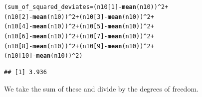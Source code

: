 \documentclass{tufte-handout}\usepackage[]{graphicx}\usepackage[]{color}
\makeatletter
\newcommand{\hlnum}[1]{\textcolor[rgb]{0.686,0.059,0.569}{#1}}%
\newcommand{\hlopt}[1]{\textcolor[rgb]{0,0,0}{#1}}%
\newcommand{\hlstd}[1]{\textcolor[rgb]{0.345,0.345,0.345}{#1}}%
\newcommand{\hlkwb}[1]{\textcolor[rgb]{0.69,0.353,0.396}{#1}}%
\newcommand{\hlkwd}[1]{\textcolor[rgb]{0.737,0.353,0.396}{\textbf{#1}}}%
\newenvironment{kframe}{%
 \def\at@end@of@kframe{}%
 \ifinner\ifhmode%
  \def\at@end@of@kframe{\end{minipage}}%
  \begin{minipage}{\columnwidth}%
 \fi\fi%
 \def\FrameCommand##1{\hskip\@totalleftmargin \hskip-\fboxsep
 \colorbox{shadecolor}{##1}\hskip-\fboxsep
     \hskip-\linewidth \hskip-\@totalleftmargin \hskip\columnwidth}%
 \MakeFramed {\advance\hsize-\width
   \@totalleftmargin\z@ \linewidth\hsize
   \@setminipage}}%
 {\par\unskip\endMakeFramed%
 \at@end@of@kframe}
\newenvironment{knitrout}{}{} %
\makeatother
\begin{document}
\begin{knitrout}
\color{fgcolor}\begin{kframe}
\begin{alltt}
\hlstd{(sum_of_squared_deviates} \hlkwb{=} \hlstd{(n10[}\hlnum{1}\hlstd{]} \hlopt{-} \hlkwd{mean}\hlstd{(n10))}\hlopt{^}\hlnum{2} \hlopt{+}
   \hlstd{(n10[}\hlnum{2}\hlstd{]} \hlopt{-} \hlkwd{mean}\hlstd{(n10))}\hlopt{^}\hlnum{2} \hlopt{+} \hlstd{(n10[}\hlnum{3}\hlstd{]} \hlopt{-} \hlkwd{mean}\hlstd{(n10))}\hlopt{^}\hlnum{2} \hlopt{+}
   \hlstd{(n10[}\hlnum{4}\hlstd{]} \hlopt{-} \hlkwd{mean}\hlstd{(n10))}\hlopt{^}\hlnum{2} \hlopt{+} \hlstd{(n10[}\hlnum{5}\hlstd{]} \hlopt{-} \hlkwd{mean}\hlstd{(n10))}\hlopt{^}\hlnum{2} \hlopt{+}
   \hlstd{(n10[}\hlnum{6}\hlstd{]} \hlopt{-} \hlkwd{mean}\hlstd{(n10))}\hlopt{^}\hlnum{2} \hlopt{+} \hlstd{(n10[}\hlnum{7}\hlstd{]} \hlopt{-} \hlkwd{mean}\hlstd{(n10))}\hlopt{^}\hlnum{2} \hlopt{+}
   \hlstd{(n10[}\hlnum{8}\hlstd{]} \hlopt{-} \hlkwd{mean}\hlstd{(n10))}\hlopt{^}\hlnum{2} \hlopt{+} \hlstd{(n10[}\hlnum{9}\hlstd{]} \hlopt{-} \hlkwd{mean}\hlstd{(n10))}\hlopt{^}\hlnum{2} \hlopt{+}
   \hlstd{(n10[}\hlnum{10}\hlstd{]} \hlopt{-} \hlkwd{mean}\hlstd{(n10))}\hlopt{^}\hlnum{2}\hlstd{)}
\end{alltt}
\begin{verbatim}
## [1] 3.936
\end{verbatim}
\end{kframe}
\end{knitrout}

We take the sum of these and divide by the degrees of freedom.
\end{document}
